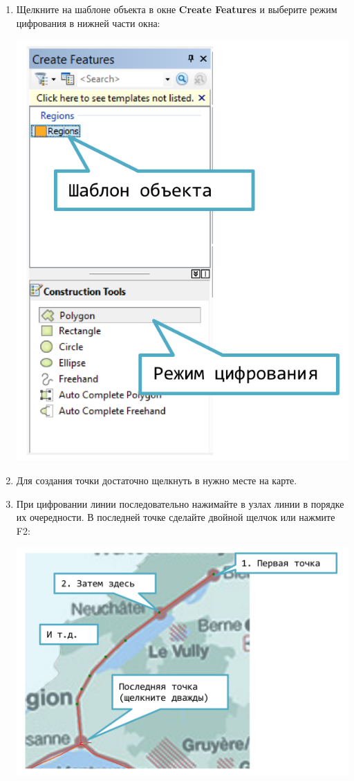 \documentclass[]{book}
\theoremstyle{definition}
\theoremstyle{definition}
\theoremstyle{definition}
\theoremstyle{remark}
\begin{document}
\begin{enumerate}
\def\labelenumi{\arabic{enumi}.}
\item
  Щелкните на шаблоне объекта в окне \textbf{Create Features} и выберите
  режим цифрования в нижней части окна:

  \includegraphics{images/Appendix/image91.png}
\item
  Для создания точки достаточно щелкнуть в нужно месте на карте.
\item
  При цифровании линии последовательно нажимайте в узлах линии в порядке
  их очередности. В последней точке сделайте двойной щелчок или нажмите
  F2:

  \includegraphics{images/Appendix/image92.png}
\end{enumerate}
\end{document}
